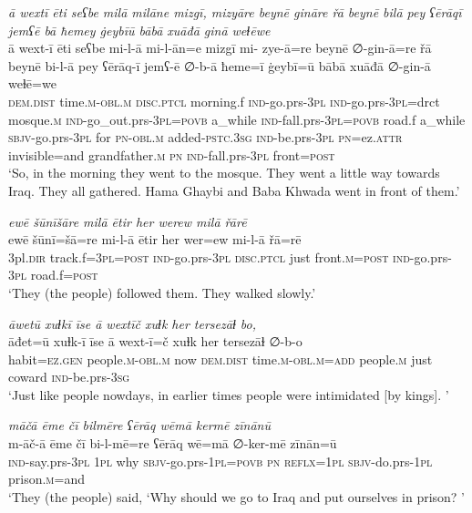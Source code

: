 \ea \label{BP.98}
\textit{ā wextī ēti seʕbe milā milāne mizgī, mizyāre beynē gināre řā beynē bilā pey ʕērāqī jemʕē bā ħemey ġeybīū bābā xuāđā ginā weɫēwe} \\ 
\gll ā wext-ī ēti seʕbe mi-l-ā mi-l-ān=e mizgī mi- zye-ā=re beynē ∅-gin-ā=re řā beynē bi-l-ā pey ʕērāq-ī jemʕ-ē ∅-b-ā ħeme=ī ġeybī=ū bābā xuāđā ∅-gin-ā weɫē=we \\ 
 \textsc{dem.dist} time\textsc{.m}\textsc{-obl}\textsc{.m} \textsc{disc.ptcl} morning.f \textsc{ind-}go.prs\textsc{-3pl} \textsc{ind-}go.prs\textsc{-3pl}=drct mosque\textsc{.m} \textsc{ind-}go\_out.prs\textsc{-3pl}\textsc{=\textsc{povb}} a\_while \textsc{ind-}fall.prs\textsc{-3pl}\textsc{=\textsc{povb}} road.f a\_while \textsc{sbjv-}go.prs\textsc{-3pl} for \textsc{pn}\textsc{-obl}\textsc{.m} added\textsc{-pstc}\textsc{.3sg} \textsc{ind-}be.prs\textsc{-3pl} \textsc{pn}=ez.\textsc{attr} invisible=and grandfather\textsc{.m} \textsc{pn} \textsc{ind-}fall.prs\textsc{-3pl} front\textsc{=\textsc{post}} \\ 
\glt `So, in the morning they went to the mosque. They went a little way towards Iraq. They all gathered. Hama Ghaybi and Baba Khwada went in front of them.'
\z 
 
\ea \label{BP.99}
\textit{ewē šūnīšāre milā ētir her werew milā řārē} \\ 
\gll ewē šūnī=šā=re mi-l-ā ētir her wer=ew mi-l-ā řā=rē \\ 
 3pl\textsc{.dir} track.f\textsc{=3pl}\textsc{=\textsc{post}} \textsc{ind-}go.prs\textsc{-3pl} \textsc{disc.ptcl} just front\textsc{.m}\textsc{=\textsc{post}} \textsc{ind-}go.prs\textsc{-3pl} road.f\textsc{=\textsc{post}} \\ 
\glt `They (the people) followed them. They walked slowly.'
\z 
 
\ea \label{BP.100}
\textit{āwetū xuɫkī īse ā wextīč xuɫk her tersezāɫ bo,} \\ 
\gll āđet=ū xuɫk-ī īse ā wext-ī=č xuɫk her tersezāɫ ∅-b-o \\ 
 habit\textsc{=ez.gen} people\textsc{.m}\textsc{-obl}\textsc{.m} now \textsc{dem.dist} time\textsc{.m}\textsc{-obl}\textsc{.m}\textsc{=add} people\textsc{.m} just coward \textsc{ind-}be.prs\textsc{-3sg} \\ 
\glt `Just like people nowdays, in earlier times people were intimidated [by kings]. '
\z 
 
\ea \label{BP.101}
\textit{māčā ēme čī bilmēre ʕērāq wēmā kermē zīnānū} \\ 
\gll m-āč-ā ēme čī bi-l-mē=re ʕērāq wē=mā ∅-ker-mē zīnān=ū \\ 
 \textsc{ind-}say.prs\textsc{-3pl} \textsc{1pl} why \textsc{sbjv-}go.prs\textsc{-\textsc{1pl}}\textsc{=\textsc{povb}} \textsc{pn} \textsc{reflx}\textsc{=\textsc{1pl}} \textsc{sbjv-}do.prs\textsc{-\textsc{1pl}} prison\textsc{.m}=and \\ 
\glt `They (the people) said, ‘Why should we go to Iraq and put ourselves in   prison? '
\z 
 
